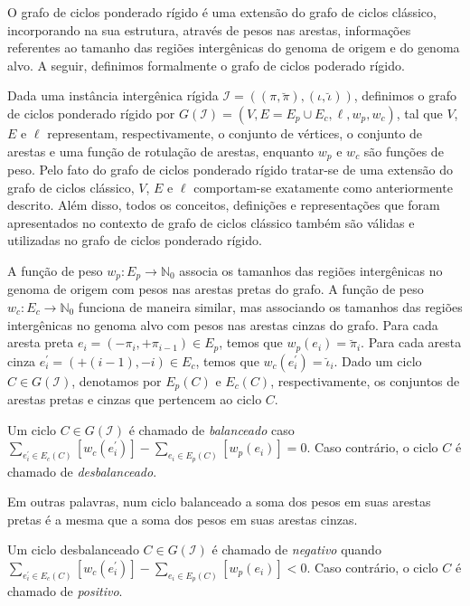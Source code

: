O grafo de ciclos ponderado rígido é uma extensão do grafo de ciclos clássico, incorporando na sua estrutura, através de pesos nas arestas, informações referentes ao tamanho das regiões intergênicas do genoma de origem e do genoma alvo. A seguir, definimos formalmente o grafo de ciclos poderado rígido.

Dada uma instância intergênica rígida $\mathcal{I} = ((\pi,\breve\pi),(\iota,\breve\iota))$, definimos o grafo de ciclos ponderado rígido por $G(\mathcal{I}) = (V, E=E_p \cup E_c, \ell, w_p, w_c)$, tal que $V$, $E$ e $\ell$ representam, respectivamente, o conjunto de vértices, o conjunto de arestas e uma função de rotulação de arestas, enquanto $w_p$ e $w_c$ são funções de peso. Pelo fato do grafo de ciclos ponderado rígido tratar-se de uma extensão do grafo de ciclos clássico, $V$, $E$ e $\ell$ comportam-se exatamente como anteriormente descrito. Além disso, todos os conceitos, definições e representações que foram apresentados no contexto de grafo de ciclos clássico também são válidas e utilizadas no grafo de ciclos ponderado rígido.

A função de peso $w_p : E_p \rightarrow \mathbb{N}_0$ associa os tamanhos das regiões intergênicas no genoma de origem com pesos nas arestas pretas do grafo. A função de peso $w_c : E_c \rightarrow \mathbb{N}_0$ funciona de maneira similar, mas associando os tamanhos das regiões intergênicas no genoma alvo com pesos nas arestas cinzas do grafo. Para cada aresta preta $e_i = (-\pi_i, +\pi_{i-1}) \in E_p$, temos que $w_p(e_i) = \breve\pi_i$. Para cada aresta cinza $e^{\prime}_i = (+(i-1), -i) \in E_c$, temos que $w_c(e^{\prime}_i) = \breve\iota_i$. Dado um ciclo $C \in G(\mathcal{I})$, denotamos por $E_p(C)$ e $E_c(C)$, respectivamente, os conjuntos de arestas pretas e cinzas que pertencem ao ciclo $C$. 

\begin{definition}
Um ciclo $C \in G(\mathcal{I})$ é chamado de \emph{balanceado} caso $\sum_{e^{\prime}_i \in E_c(C)} [w_c(e^{\prime}_i)] - \sum_{e_i \in E_p(C)} [w_p(e_i)] = 0$. Caso contrário, o ciclo $C$ é chamado de \emph{desbalanceado}.
\end{definition}

Em outras palavras, num ciclo balanceado a soma dos pesos em suas arestas pretas é a mesma que a soma dos pesos em suas arestas cinzas. 

\begin{definition}
Um ciclo desbalanceado $C \in G(\mathcal{I})$ é chamado de \emph{negativo} quando $\sum_{e^{\prime}_i \in E_c(C)} [w_c(e^{\prime}_i)] - \sum_{e_i \in E_p(C)} [w_p(e_i)] < 0$. Caso contrário, o ciclo $C$ é chamado de \emph{positivo}.
\end{definition}

